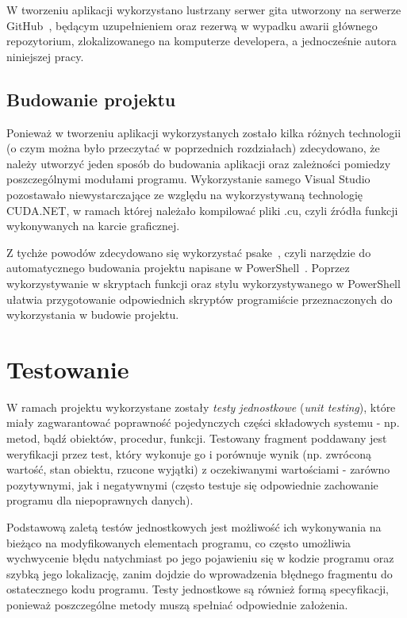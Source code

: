 W tworzeniu aplikacji wykorzystano lustrzany serwer gita utworzony na serwerze GitHub~\cite{cs:github}, będącym uzupełnieniem oraz rezerwą w wypadku awarii głównego repozytorium, zlokalizowanego na komputerze developera, a jednocześnie autora niniejszej pracy.

\subsection{Budowanie projektu}
Ponieważ w tworzeniu aplikacji wykorzystanych zostało kilka różnych technologii (o czym można było przeczytać w poprzednich rozdziałach) zdecydowano, że należy utworzyć jeden sposób do budowania aplikacji oraz zależności pomiedzy poszczególnymi modułami programu. Wykorzystanie samego Visual Studio pozostawało niewystarczające ze względu na wykorzystywaną technologię CUDA.NET, w ramach której należało kompilować pliki .cu, czyli źródła funkcji wykonywanych na karcie graficznej.

Z tychże powodów zdecydowano się wykorzystać psake~\cite{cs:psake}, czyli narzędzie do automatycznego budowania projektu napisane w PowerShell~\cite{ms:powershell}. Poprzez wykorzystywanie w skryptach funkcji oraz stylu wykorzystywanego w PowerShell ułatwia przygotowanie odpowiednich skryptów programiście przeznaczonych do wykorzystania w budowie projektu.

\section{Testowanie}
W ramach projektu wykorzystane zostały \emph{testy jednostkowe} (\emph{unit testing}), które miały zagwarantować poprawność pojedynczych części składowych systemu - np. metod, bądź obiektów, procedur, funkcji. Testowany fragment poddawany jest weryfikacji przez test, który wykonuje go i porównuje wynik (np. zwróconą wartość, stan obiektu, rzucone wyjątki) z oczekiwanymi wartościami - zarówno pozytywnymi, jak i negatywnymi (często testuje się odpowiednie zachowanie programu dla niepoprawnych danych). 

Podstawową zaletą testów jednostkowych jest możliwość ich wykonywania na bieżąco na modyfikowanych elementach programu, co często umożliwia wychwycenie błędu natychmiast po jego pojawieniu się w kodzie programu oraz szybką jego lokalizację, zanim dojdzie do wprowadzenia błędnego fragmentu do ostatecznego kodu programu. Testy jednostkowe są również formą specyfikacji, ponieważ poszczególne metody muszą spełniać odpowiednie założenia. 

